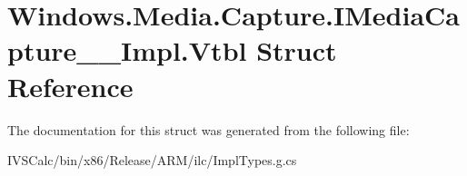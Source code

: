 \hypertarget{struct_windows_1_1_media_1_1_capture_1_1_i_media_capture_____impl_1_1_vtbl}{}\section{Windows.\+Media.\+Capture.\+I\+Media\+Capture\+\_\+\+\_\+\+Impl.\+Vtbl Struct Reference}
\label{struct_windows_1_1_media_1_1_capture_1_1_i_media_capture_____impl_1_1_vtbl}


The documentation for this struct was generated from the following file\+:\begin{DoxyCompactItemize}
\item 
I\+V\+S\+Calc/bin/x86/\+Release/\+A\+R\+M/ilc/Impl\+Types.\+g.\+cs\end{DoxyCompactItemize}
